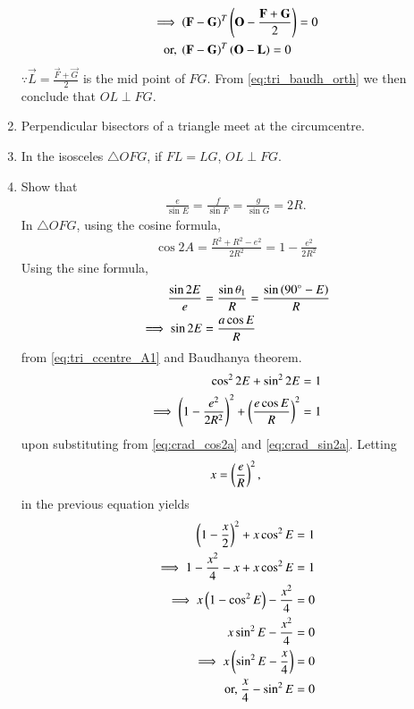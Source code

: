 \begin{enumerate}[label=\thesection.\arabic*.,ref=\thesection.\theenumi]
\begin{align}
\implies \left(\mathbf{F}-\mathbf{G}\right)^T&\left(\mathbf{O} - \frac{\mathbf{F}+\mathbf{G}}{2}\right) = 0
\\
\text{or, } \left(\mathbf{F}-\mathbf{G}\right)^T&\left(\mathbf{O} - \mathbf{L}\right) = 0
\end{align}
%
$\because \vec{L} = \frac{\vec{F}+\vec{G}}{2}$ is the mid point of $FG$.  From \eqref{eq:tri_baudh_orth} we then conclude that $OL \perp FG$.
%
\item Perpendicular bisectors of a triangle meet at the circumcentre.
%
\item In the isosceles $\triangle OFG$, if $FL = LG$, $OL \perp FG$.
\label{them:isos_pb}

\item Show that 
\begin{align}
\label{eq:tri_crad_R}
\frac{e}{\sin E} = \frac{f}{\sin F} = \frac{g}{\sin G} = 2R.
\end{align}
%
\solution In $\triangle OFG$, using the cosine formula, 
\begin{align}
\cos 2A = \frac{R^2+R^2 - e^2}{2R^2} = 1 -\frac{e^2}{2R^2}
\label{eq:crad_cos2a}
\end{align}
%
Using the sine formula, 
\begin{align}
\frac{\sin 2E}{e} &= \frac{\sin \theta_1}{R} = \frac{\sin\left(90\degree- E\right)}{R}
\\
\implies \sin 2E &= \frac{a\cos E}{R}
\label{eq:crad_sin2a}
\end{align}
%
from \eqref{eq:tri_ccentre_A1} and Baudhanya theorem. 
\begin{align}
\cos^2 2E + \sin^2 2E&= 1
\\
\implies \left(1 -\frac{e^2}{2R^2}\right)^2 + \left(\frac{e\cos E}{R}\right)^2 &= 1
\end{align}
%
upon substituting from \eqref{eq:crad_cos2a}  and \eqref{eq:crad_sin2a}.  Letting
%
\begin{align}
\label{eq:tri_crad_x}
x = \left(\frac{e}{R}\right)^2,
\end{align}
%
in the previous equation yields
%
\begin{align}
 \left(1 -\frac{x}{2}\right)^2 + x\cos^2 E&= 1
\\
\implies 1 - \frac{x^2}{4} -x + x\cos^2 E&= 1
\\
\implies x\left(1-\cos^2 E\right) - \frac{x^2}{4} &= 0
\\
x\sin^2 E - \frac{x^2}{4} &= 0
\\
\implies x\left(\sin^2 E - \frac{x}{4}\right) &= 0
\\
\text{or, } \frac{x}{4} - \sin^2 E &=0
\end{align}

\end{enumerate}
